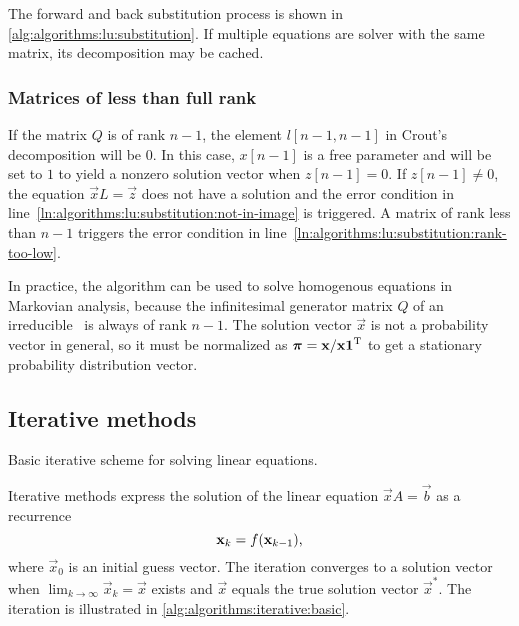 The forward and back substitution process is shown in
\vref{alg:algorithms:lu:substitution}. If multiple equations are
solver with the same matrix, its  decomposition may be
cached.

\subsubsection{Matrices of less than full rank}

If the matrix $Q$ is of rank $n - 1$, the element $l[n - 1, n - 1]$ in
Crout's  decomposition will be $0$. In this case,
$x[n - 1]$ is a free parameter and will be set to $1$ to yield a
nonzero solution vector when $z[n - 1] = 0$. If $z[n - 1] \ne 0$, the
equation $\vec{x} L = \vec{z}$ does not have a solution and the error
condition in line~\ref{ln:algorithms:lu:substitution:not-in-image} is
triggered. A matrix of rank less than $n - 1$ triggers the error
condition in line~\ref{ln:algorithms:lu:substitution:rank-too-low}.

In practice, the algorithm can be used to solve homogenous equations
in Markovian analysis, because the infinitesimal generator matrix $Q$
of an irreducible \CTMC\ is always of rank $n - 1$. The solution
vector $\vec{x}$ is not a probability vector in general, so it must be
normalized as $\vec{\pi} = \vec{x} / \vec{x} \vec{1}^\T$ to get a
stationary probability distribution vector.

\subsection{Iterative methods}

\begin{algorithm}
  \;
  \caption{Basic iterative scheme for solving linear equations.}
  \label{alg:algorithms:iterative:basic}
\end{algorithm}

Iterative methods express the solution of the linear equation $\vec{x}
A = \vec{b}$ as a recurrence
\begin{equation}
  \vec{x}_{k} = f(\vec{x}_{k - 1}) \text,
\end{equation}
where $\vec{x}_0$ is an initial guess vector. The iteration converges
to a solution vector when $\lim_{k \to \infty} \vec{x}_k = \vec{x}$
exists and $\vec{x}$ equals the true solution vector $\vec{x}^*$. The
iteration is illustrated in \vref{alg:algorithms:iterative:basic}.

